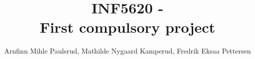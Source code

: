 \documentclass[a4paper, english,10pt]{article}
\begin{document}
\title{INF5620 - \\  First compulsory project}
\author{Arnfinn Mihle Paulsrud, Mathilde Nygaard Kamperud, Fredrik Eksaa Pettersen}
\maketitle






\end{document}
